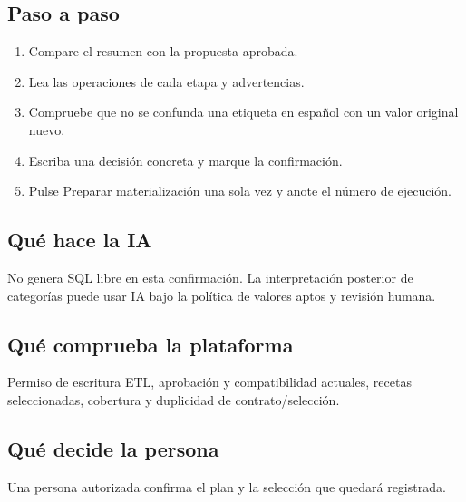 \subsection{Paso a paso}
\begin{enumerate}
\item Compare el resumen con la propuesta aprobada.\par\nopagebreak[4]
\item Lea las operaciones de cada etapa y advertencias.\par\nopagebreak[4]
\item Compruebe que no se confunda una etiqueta en español con un valor original nuevo.\par\nopagebreak[4]
\item Escriba una decisión concreta y marque la confirmación.\par\nopagebreak[4]
\item Pulse Preparar materialización una sola vez y anote el número de ejecución.\par\nopagebreak[4]
\end{enumerate}
\subsection{Qué hace la IA}
No genera SQL libre en esta confirmación. La interpretación posterior de categorías puede usar IA bajo la política de valores aptos y revisión humana.

\subsection{Qué comprueba la plataforma}
Permiso de escritura ETL, aprobación y compatibilidad actuales, recetas seleccionadas, cobertura y duplicidad de contrato/selección.

\subsection{Qué decide la persona}
Una persona autorizada confirma el plan y la selección que quedará registrada.

